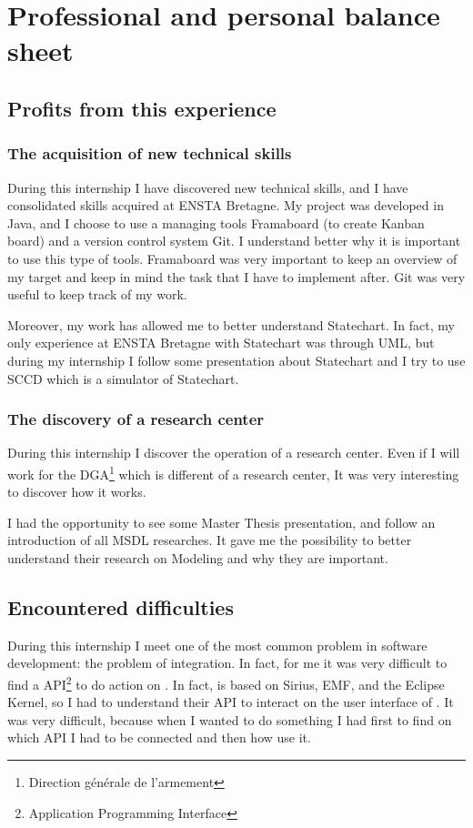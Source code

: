 
\chapter{Professional and personal balance sheet}

\section{Profits from this experience}

\subsection{The acquisition of new technical skills}

During this internship I have discovered new technical skills, and I have consolidated skills acquired at ENSTA Bretagne. My project was developed in Java, and I choose to use a managing tools Framaboard (to create Kanban board) and a version control system Git. I understand better why it is important to use this type of tools. Framaboard was very important to keep an overview of my target and keep in mind the task that I have to implement after. Git was very useful to keep track of my work.

Moreover, my work has allowed me to better understand Statechart. In fact, my only experience at ENSTA Bretagne with Statechart was through UML, but during my internship I follow some presentation about Statechart and I try to use SCCD which is a simulator of Statechart.



\subsection{The discovery of a research center}

During this internship I discover the operation of a research center. Even if I will work for the DGA\footnote{Direction générale de l'armement} which is different of a research center, It was very interesting to discover how it works.

I had the opportunity to see some Master Thesis presentation, and follow an introduction of all MSDL researches. It gave me the possibility to better understand their research on Modeling and why they are important.


\section{Encountered difficulties}

During this internship I meet one of the most common problem in software development: the problem of integration. In fact, for me it was very difficult to find a API\footnote{Application Programming Interface} to do action on \umld. In fact, \umld is based on Sirius, EMF, and the Eclipse Kernel, so I had to understand their API to interact on the user interface of \umld. It was very difficult, because when I wanted to do something I had first to find on which API I had to be connected and then how use it.




